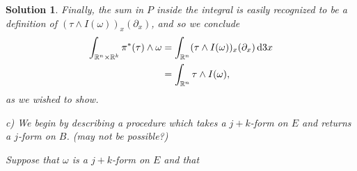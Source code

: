 \documentclass{article}
\theoremstyle{nonumberplain}
\newtheorem{sol}{Solution}
\newcommand{\R}{\mathbb{R}}
\begin{document}
\begin{sol}
Finally, the sum in $P$ inside the integral is easily recognized to be a definition of $(\tau \wedge I(\omega))_x(\partial_x)$, and so we conclude
\begin{align*}
\int_{\R^n \times \R^k} \pi^*(\tau) \wedge \omega &= \int_{\R^n} (\tau \wedge I(\omega))_x(\partial_x) \dl3 x\\
&= \int_{\R^n} \tau \wedge I(\omega),
\end{align*}
as we wished to show.

\medskip

c) We begin by describing a procedure which takes a $j+k$-form on $E$ and returns a $j$-form on $B$. (may not be possible?)

Suppose that $\omega$ is a $j+k$-form on $E$ and that
\end{sol}
\end{document}
